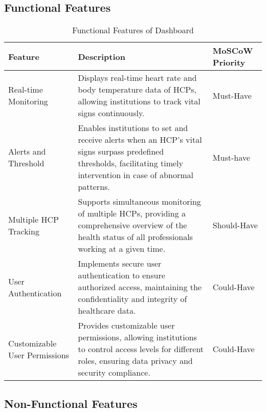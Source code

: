 \subsection{Functional Features}

\begin{table}[h]
    \centering
    \begin{tabularx}{\textwidth}{|p{3cm}|X|p{2cm}|}

         \hline

         \textbf{Feature}
         & \textbf{Description}
         & \textbf{MoSCoW Priority} \\ \hline

         Real-time Monitoring
         & Displays real-time heart rate and body temperature data of HCPs, allowing institutions to track vital signs continuously.
         & Must-Have \\ \hline

         Alerts and Threshold
         & Enables institutions to set and receive alerts when an HCP's vital signs surpass predefined thresholds, facilitating timely intervention in case of abnormal patterns.
         & Must-have \\ \hline

         Multiple HCP Tracking 
         & Supports simultaneous monitoring of multiple HCPs, providing a comprehensive overview of the health status of all professionals working at a given time.
         & Should-Have \\ \hline

         User Authentication
         & Implements secure user authentication to ensure authorized access, maintaining the confidentiality and integrity of healthcare data.
         & Could-Have \\ \hline

         Customizable User Permissions
         & Provides customizable user permissions, allowing institutions to control access levels for different roles, ensuring data privacy and security compliance.
         & Could-Have \\ \hline


         
    \end{tabularx}
    \caption{Functional Features of Dashboard}
    \label{table:functional-db}
\end{table}


\newpage
\subsection{Non-Functional Features}

